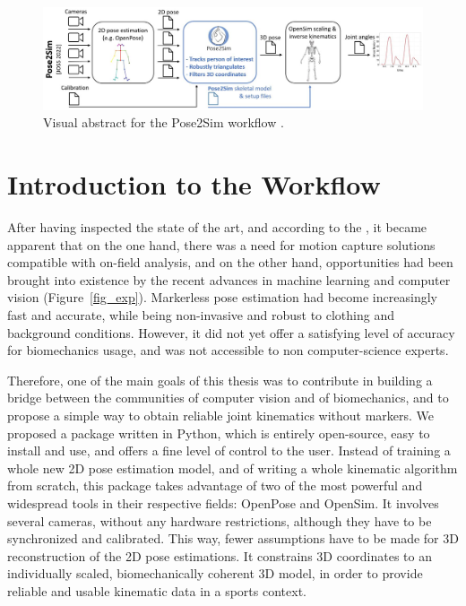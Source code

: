 \pagebreak
\minitoc

\vspace*{3cm}

\begin{figure}[hbtp]
	\centering
	\def\svgwidth{1\columnwidth}
	\fontsize{10pt}{10pt}\selectfont
	\includegraphics[width=\linewidth]{"../Intro/Figures/Fig_VisAbstract1.JPG"}
      \caption{Visual abstract for the Pose2Sim workflow \cite{Pagnon2022b}.}
	\label{fig_visabstract1}
\end{figure}

\newpage


\section{Introduction to the Workflow}

After having inspected the state of the art, and according to the , it became apparent that on the one hand, there was a need for motion capture solutions compatible with on-field analysis, and on the other hand, opportunities had been brought into existence by the recent advances in machine learning and computer vision (Figure~\ref{fig_exp}). Markerless pose estimation had become increasingly fast and accurate, while being non-invasive and robust to clothing and background conditions. However, it did not yet offer a satisfying level of accuracy for biomechanics usage, and was not accessible to non computer-science experts.

Therefore, one of the main goals of this thesis was to contribute in building a bridge between the communities of computer vision and of biomechanics, and to propose a simple way to obtain reliable joint kinematics without markers. We proposed a package written in Python, which is entirely open-source, easy to install and use, and offers a fine level of control to the user. Instead of training a whole new 2D pose estimation model, and of writing a whole kinematic algorithm from scratch, this package takes advantage of two of the most powerful and widespread tools in their respective fields: OpenPose and OpenSim. It involves several cameras, without any hardware restrictions, although they have to be synchronized and calibrated. This way, fewer assumptions have to be made for 3D reconstruction of the 2D pose estimations. It constrains 3D coordinates to an individually scaled, biomechanically coherent 3D model, in order to provide reliable and usable kinematic data in a sports context. 

